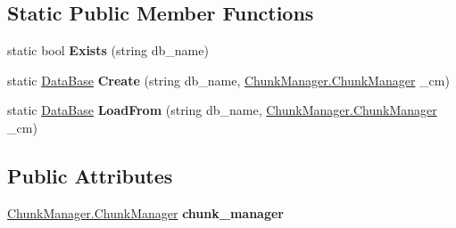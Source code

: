 \subsection*{Static Public Member Functions}
\begin{DoxyCompactItemize}
\item 
\hypertarget{class_dwarf_d_b_1_1_data_structures_1_1_data_base_a984abdba15e81a2f8e5cd1345986202a}{
static bool {\bfseries Exists} (string db\_\-name)}
\label{class_dwarf_d_b_1_1_data_structures_1_1_data_base_a984abdba15e81a2f8e5cd1345986202a}

\item 
\hypertarget{class_dwarf_d_b_1_1_data_structures_1_1_data_base_ace80fe82a351705958326c8d2a7f03ff}{
static \hyperlink{class_dwarf_d_b_1_1_data_structures_1_1_data_base}{DataBase} {\bfseries Create} (string db\_\-name, \hyperlink{class_dwarf_d_b_1_1_chunk_manager_1_1_chunk_manager}{ChunkManager.ChunkManager} \_\-cm)}
\label{class_dwarf_d_b_1_1_data_structures_1_1_data_base_ace80fe82a351705958326c8d2a7f03ff}

\item 
\hypertarget{class_dwarf_d_b_1_1_data_structures_1_1_data_base_af709d60f64dc5065a95dc678ebc03f30}{
static \hyperlink{class_dwarf_d_b_1_1_data_structures_1_1_data_base}{DataBase} {\bfseries LoadFrom} (string db\_\-name, \hyperlink{class_dwarf_d_b_1_1_chunk_manager_1_1_chunk_manager}{ChunkManager.ChunkManager} \_\-cm)}
\label{class_dwarf_d_b_1_1_data_structures_1_1_data_base_af709d60f64dc5065a95dc678ebc03f30}

\end{DoxyCompactItemize}
\subsection*{Public Attributes}
\begin{DoxyCompactItemize}
\item 
\hypertarget{class_dwarf_d_b_1_1_data_structures_1_1_data_base_a8ccf11a71c383f6f1ac6870022a261c3}{
\hyperlink{class_dwarf_d_b_1_1_chunk_manager_1_1_chunk_manager}{ChunkManager.ChunkManager} {\bfseries chunk\_\-manager}}
\label{class_dwarf_d_b_1_1_data_structures_1_1_data_base_a8ccf11a71c383f6f1ac6870022a261c3}

\end{DoxyCompactItemize}

